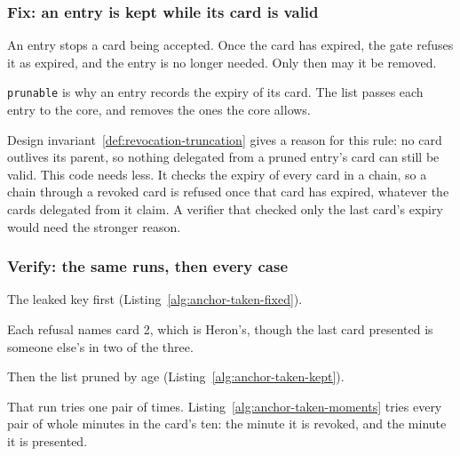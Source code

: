 \subsubsection{Fix: an entry is kept while its card is valid}

An entry stops a card being accepted. Once the card has expired, the gate
refuses it as expired, and the entry is no longer needed. Only then may it
be removed.



\texttt{prunable} is why an entry records the expiry of its card. The list
passes each entry to the core, and removes the ones the core allows.

Design invariant~\ref{def:revocation-truncation} gives a reason for this
rule: no card outlives its parent, so nothing delegated from a pruned
entry's card can still be valid. This code needs less. It checks
the expiry of every card in a chain, so a chain through a revoked card is
refused once that card has expired, whatever the cards delegated from
it claim. A verifier that checked only the last card's expiry would need the
stronger reason.

\subsubsection{Verify: the same runs, then every case}

The leaked key first (Listing~\ref{alg:anchor-taken-fixed}).


Each refusal names card 2, which is Heron's, though the last card presented
is someone else's in two of the three.

Then the list pruned by age (Listing~\ref{alg:anchor-taken-kept}).


That run tries one pair of times. Listing~\ref{alg:anchor-taken-moments}
tries every pair of whole minutes in the card's ten: the minute it is
revoked, and the minute it is presented.

